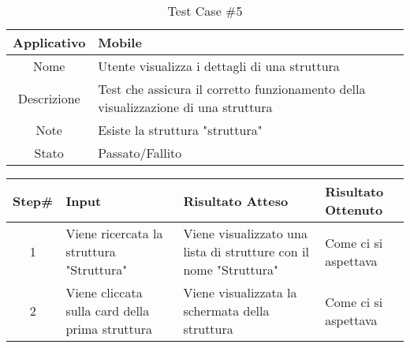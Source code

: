 
\begin{table}[H]
    \centering
    \footnotesize
    \caption{Test Case \#5}
    \begin{tabularx}{\textwidth}{|c|X|}
        \hline
        Applicativo & Mobile\\
        \hline
        Nome & Utente visualizza i dettagli di una struttura  \\
        \hline
        Descrizione & Test che assicura il corretto funzionamento della visualizzazione di una struttura\\
        \hline
        Note & Esiste la struttura "struttura"\\
        \hline
        Stato & Passato/Fallito\\
        \hline

    \end{tabularx}
    \setlength{\tabcolsep}{8pt}
    \renewcommand{\arraystretch}{1.5}
\end{table}

\begin{table}[H]
    \footnotesize
    \begin{tabularx}{\textwidth}{|c|X|X|X|}
        \hline
        Step\# & Input & Risultato Atteso & Risultato Ottenuto \\
        \hline
         1 & Viene ricercata la struttura "Struttura"
         & Viene visualizzato una lista di strutture con il nome "Struttura"
         &Come ci si aspettava \\
          \hline
        2 & Viene cliccata sulla card della prima struttura
        & Viene visualizzata la schermata della struttura
        & Come ci si aspettava\\
\hline
    \end{tabularx}
\end{table}
    
       
